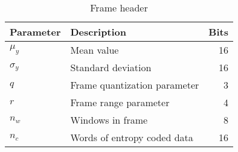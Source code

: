 \begin{table}[ht]
\centering
\caption{Frame header}
\begin{tabular}{llr}
\toprule
Parameter & Description & Bits \\
\midrule

$\mu_y$ & Mean value & 16\\
$\sigma_y$ & Standard deviation & 16 \\
$q$ &  Frame quantization parameter & 3\\
$r$ &  Frame range parameter & 4 \\
$n_w$ & Windows in frame & 8 \\
$n_c$ & Words of entropy coded data& 16 \\
\bottomrule
\end{tabular}
\label{tbl:header:frame}
\end{table}

